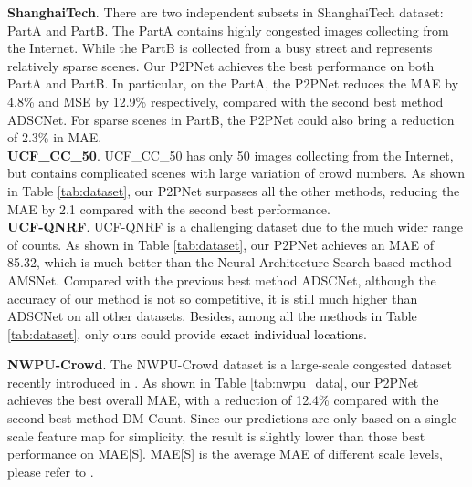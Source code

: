 \documentclass[10pt,twocolumn,letterpaper]{article}
\newcommand{\ywu}[1]{\textcolor{black}{#1}}
\begin{document}
\noindent\textbf{ShanghaiTech}. There are two independent subsets in ShanghaiTech dataset: PartA and PartB. The PartA contains highly congested images collecting from the Internet. While the PartB is collected from a busy street and represents relatively sparse scenes. Our P2PNet achieves the best performance on both PartA and PartB. In particular, on the PartA, the P2PNet reduces the MAE by 4.8\% and MSE by 12.9\% respectively, compared with the second best method ADSCNet. For sparse scenes in PartB, the P2PNet could also bring a reduction of 2.3\% in MAE. \\
\noindent\textbf{UCF\_CC\_50}. UCF\_CC\_50 has only 50 images collecting from the Internet, but contains complicated scenes with large variation of crowd numbers. As shown in Table \ref{tab:dataset}, our P2PNet surpasses all the other methods, reducing the MAE by 2.1 compared with the second best performance. \\
\noindent\textbf{UCF-QNRF}. UCF-QNRF is a challenging dataset due to the much wider range of counts. As shown in Table \ref{tab:dataset}, our P2PNet achieves an MAE of 85.32, which is much better than the Neural Architecture Search based method AMSNet. Compared with the previous best method ADSCNet, although the accuracy of our method is not so competitive, it is still much higher than ADSCNet on all other datasets. Besides, among all the methods in Table \ref{tab:dataset}, only \ywu{ours} could provide \ywu{exact individual locations}.

\noindent\textbf{NWPU-Crowd}. The NWPU-Crowd dataset is a large-scale congested dataset recently introduced in \cite{wang2020nwpu}. As shown in Table \ref{tab:nwpu_data}, our P2PNet achieves the best overall MAE, with a reduction of 12.4\% compared with the second best method DM-Count. Since our predictions are only based on a single scale feature map for simplicity, the result is slightly lower than those best performance on MAE[S]. MAE[S] is the average MAE of different scale levels, please refer to \cite{wang2020nwpu}. 
\end{document}
